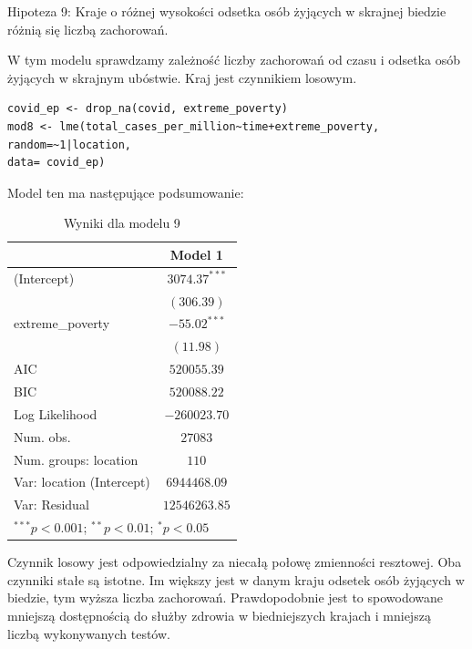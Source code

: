 \documentclass[12pt]{mwbk}
\theoremstyle{plain}
\theoremstyle{definition}
\theoremstyle{remark}
\begin{document}
Hipoteza 9: Kraje o różnej wysokości odsetka osób żyjących w skrajnej biedzie różnią się liczbą zachorowań.

W tym modelu sprawdzamy zależność liczby zachorowań od czasu i odsetka osób żyjących w skrajnym ubóstwie. Kraj jest czynnikiem losowym.

\begin{verbatim}
covid_ep <- drop_na(covid, extreme_poverty)
mod8 <- lme(total_cases_per_million~time+extreme_poverty,
random=~1|location,
data= covid_ep)
\end{verbatim}

Model ten ma następujące podsumowanie:

\begin{table}
	\begin{center}
		\begin{tabular}{l c}
			\hline
			& Model 1 \\
			\hline
			(Intercept)               & $3074.37^{***}$ \\
			& $(306.39)$      \\
			extreme\_poverty          & $-55.02^{***}$  \\
			& $(11.98)$       \\
			\hline
			AIC                       & $520055.39$     \\
			BIC                       & $520088.22$     \\
			Log Likelihood            & $-260023.70$    \\
			Num. obs.                 & $27083$         \\
			Num. groups: location     & $110$           \\
			Var: location (Intercept) & $6944468.09$    \\
			Var: Residual             & $12546263.85$   \\
			\hline
			\multicolumn{2}{l}{\scriptsize{$^{***}p<0.001$; $^{**}p<0.01$; $^{*}p<0.05$}}
		\end{tabular}
		\caption{Wyniki dla modelu 9}
		\label{table:model9}
	\end{center}
\end{table}

Czynnik losowy jest odpowiedzialny za niecałą połowę zmienności resztowej. Oba czynniki stałe są istotne. Im większy jest w danym kraju odsetek osób żyjących w biedzie, tym wyższa liczba zachorowań. Prawdopodobnie jest to spowodowane mniejszą dostępnością do służby zdrowia w biedniejszych krajach i mniejszą liczbą wykonywanych testów.
\end{document}
